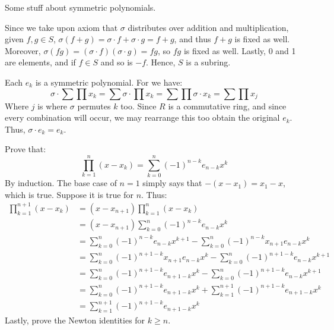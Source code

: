 \documentclass{article}                                                        %
\begin{document}
    \begin{problem}
        Some stuff about symmetric polynomials.
    \end{problem}
    \begin{solution}
        Since we take upon axiom that $\sigma$ distributes over addition and
        multiplication, given $f,g\in{S}$,
        $\sigma(f+g)=\sigma\cdot{f}+\sigma\cdot{g}=f+g$, and thus $f+g$ is fixed
        as well. Moreover, $\sigma(fg)=(\sigma\cdot{f})(\sigma\cdot{g})=fg$,
        so $fg$ is fixed as well. Lastly, 0 and 1 are elements, and if $f\in{S}$
        and so is $\minus{f}$. Hence, $S$ is a subring.
        \par\hfill\par
        Each $e_{k}$ is a symmetric polynomial. For we have:
        \begin{equation}
            \sigma\cdot\sum\prod{x}_{k}=
            \sum\sigma\cdot\prod{x}_{k}=
            \sum\prod\sigma\cdot{x}_{k}=
            \sum\prod{x}_{j}
        \end{equation}
        Where $j$ is where $\sigma$ permutes $k$ too. Since $R$ is a commutative
        ring, and since every combination will occur, we may rearrange this too
        obtain the original $e_{k}$. Thus, $\sigma\cdot{e}_{k}=e_{k}$.
        \par\hfill\par
        Prove that:
        \begin{equation}
            \prod_{k=1}^{n}(x-x_{k})=\sum_{k=0}^{n}(\minus{1})^{n-k}e_{n-k}x^{k}
        \end{equation}
        By induction. The base case of $n=1$ simply says that
        $\minus(x-x_{1})=x_{1}-x$, which is true. Suppose it is true for $n$.
        Thus:
        \begin{align}
            \prod_{k=1}^{n+1}(x-x_{k})
                &=(x-x_{n+1})\prod_{k=1}^{n}(x-x_{k})\\
                &=(x-x_{n+1})\sum_{k=0}^{n}(\minus{1})^{n-k}e_{n-k}x^{k}\\
                &=\sum_{k=0}^{n}(\minus{1})^{n-k}e_{n-k}x^{k+1}
                    -\sum_{k=0}^{n}(\minus{1})^{n-k}x_{n+1}e_{n-k}x^{k}\\
                &=\sum_{k=0}^{n}(\minus{1})^{n+1-k}x_{n+1}e_{n-k}x^{k}
                    -\sum_{k=0}^{n}(\minus{1})^{n+1-k}e_{n-k}x^{k+1}\\
                &=\sum_{k=0}^{n}(\minus{1})^{n+1-k}e_{n+1-k}x^{k}
                    -\sum_{k=0}^{n}(\minus{1})^{n+1-k}e_{n-k}x^{k+1}\\
                &=\sum_{k=0}^{n}(\minus{1})^{n+1-k}e_{n+1-k}x^{k}
                    +\sum_{k=1}^{n+1}(\minus{1})^{n+1-k}e_{n+1-k}x^{k}\\
                &=\sum_{k=1}^{n+1}(\minus{1})^{n+1-k}e_{n+1-k}x^{k}
        \end{align}
        Lastly, prove the Newton identities for $k\geq{n}$.
    \end{solution}
\end{document}

